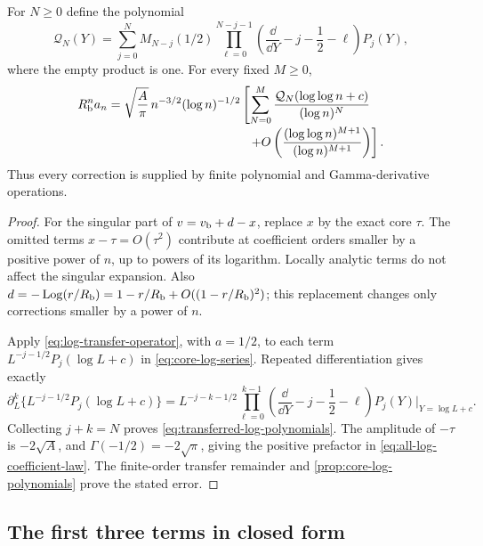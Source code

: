 \begin{theorem}
\label{thm:all-logarithmic-coefficients}
For $N\ge0$ define the polynomial
\begin{equation}\label{eq:transferred-log-polynomials}
 \mathcal Q_N(Y)=\sum_{j=0}^{N}M_{N-j}(1/2)
 \prod_{\ell=0}^{N-j-1}
 \left(\frac{\dd}{\dd Y}-j-\frac12-\ell\right)P_j(Y),
\end{equation}
where the empty product is one.  For every fixed $M\ge0$,
\begin{equation}\label{eq:all-log-coefficient-law}
 \begin{split}
 \Rb^n a_n={}&\sqrt{\frac A\pi}\,
 n^{-3/2}(\log n)^{-1/2}\left[
 \sum_{N=0}^{M}
 \frac{\mathcal Q_N(\log\log n+c)}{(\log n)^N}
 \right.\\[-2pt]
 &\left.\hspace{35mm}
 +O\left(\frac{(\log\log n)^{M+1}}{(\log n)^{M+1}}\right)
 \right].
 \end{split}
\end{equation}
Thus every correction is supplied by finite polynomial and
Gamma-derivative operations.
\end{theorem}

\begin{proof}
For the singular part of $v=v_{\mathrm b}+d-x$, replace $x$ by the exact
core $\tau$.  The omitted terms $x-\tau=O(\tau^2)$ contribute at
coefficient orders smaller by a positive power of $n$, up to powers of
its logarithm.  Locally analytic terms do not affect the singular
expansion.  Also $d=-\operatorname{Log}(r/R_{\mathrm b})=1-r/R_{\mathrm b}+O((1-r/R_{\mathrm b})^2)$;
this replacement changes only corrections smaller by a power of $n$.

Apply \eqref{eq:log-transfer-operator}, with $a=1/2$, to each
term $L^{-j-1/2}P_j(\log L+c)$ in
\eqref{eq:core-log-series}.  Repeated differentiation gives exactly
\[
 \partial_L^k\{L^{-j-1/2}P_j(\log L+c)\}
 =L^{-j-k-1/2}
 \prod_{\ell=0}^{k-1}
 \left(\frac{\dd}{\dd Y}-j-\frac12-\ell\right)P_j(Y)
 \bigg|_{Y=\log L+c}.
\]
Collecting $j+k=N$ proves \eqref{eq:transferred-log-polynomials}.
The amplitude of $-\tau$ is $-2\sqrt A$, and
$\Gamma(-1/2)=-2\sqrt\pi$, giving the positive prefactor in
\eqref{eq:all-log-coefficient-law}.  The finite-order transfer
remainder and \cref{prop:core-log-polynomials} prove the stated error.
\end{proof}

\subsection{The first three terms in closed form}

